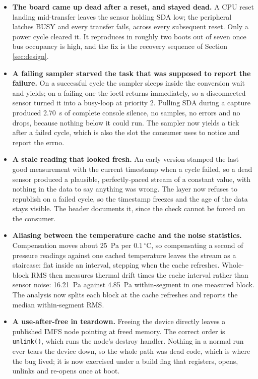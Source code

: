 \documentclass[10pt,a4]{article}
\begin{document}
\begin{itemize}
\item \textbf{The board came up dead after a reset, and stayed dead.} A CPU
  reset landing mid-transfer leaves the sensor holding SDA low; the peripheral
  latches BUSY and every transfer fails, across every subsequent reset. Only a
  power cycle cleared it. It reproduces in roughly two boots out of seven once
  bus occupancy is high, and the fix is the recovery sequence of Section
  \ref{sec:design}.

\item \textbf{A failing sampler starved the task that was supposed to report the
  failure.} On a successful cycle the sampler sleeps inside the conversion wait
  and yields; on a failing one the ioctl returns immediately, so a disconnected
  sensor turned it into a busy-loop at priority 2. Pulling SDA during a capture
  produced 2.70~s of complete console silence, no samples, no errors and no
  drops, because nothing below it could run. The sampler now yields a tick after
  a failed cycle, which is also the slot the consumer uses to notice and report
  the errno.

\item \textbf{A stale reading that looked fresh.} An early version stamped the
  last good measurement with the current timestamp when a cycle failed, so a
  dead sensor produced a plausible, perfectly-paced stream of a constant value,
  with nothing in the data to say anything was wrong. The layer now refuses to
  republish on a failed cycle, so the timestamp freezes and the age of the data
  stays visible. The header documents it, since the check cannot be forced on
  the consumer.

\item \textbf{Aliasing between the temperature cache and the noise
  statistics.} Compensation moves about 25~Pa per $0.1\,^{\circ}$C, so
  compensating a second of pressure readings against one cached temperature
  leaves the stream as a staircase: flat inside an interval, stepping when the
  cache refreshes. Whole-block RMS then measures thermal drift times the cache
  interval rather than sensor noise: 16.21~Pa against 4.85~Pa within-segment in
  one measured block. The analysis now splits each block at the cache refreshes
  and reports the median within-segment RMS.

\item \textbf{A use-after-free in teardown.} Freeing the device directly leaves
  a published IMFS node pointing at freed memory. The correct order is
  \texttt{unlink()}, which runs the node's destroy handler. Nothing in a normal
  run ever tears the device down, so the whole path was dead code, which is
  where the bug lived; it is now exercised under a build flag that registers,
  opens, unlinks and re-opens once at boot.
\end{itemize}
\end{document}
